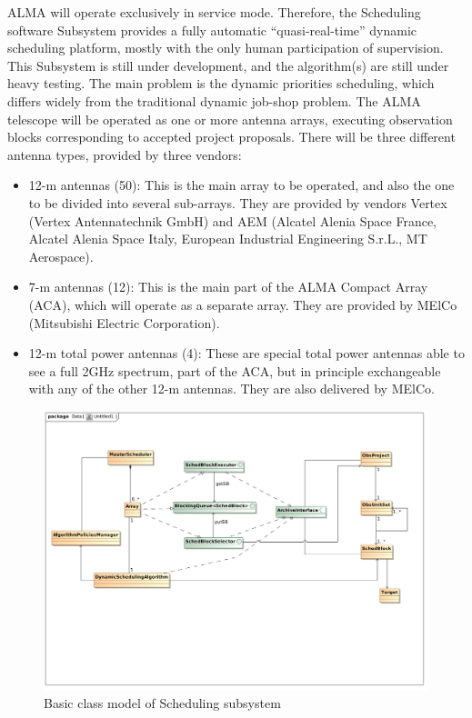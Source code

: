 ALMA will operate exclusively in service mode. Therefore, the Scheduling software Subsystem provides a fully automatic “quasi-real-time” dynamic scheduling platform, mostly with the only human participation of supervision. This Subsystem is still under development, and the algorithm(s) are still under heavy testing. The main problem is the dynamic priorities scheduling, which differs widely from the traditional dynamic job-shop problem.
The ALMA telescope will be operated as one or more antenna arrays, executing observation blocks corresponding to accepted project proposals. There will be three different antenna types, provided by three vendors:
\begin{itemize}
\item 12-m antennas (50): This is the main array to be operated, and also the one to be divided into several sub-arrays. They are provided by vendors Vertex (Vertex Antennatechnik GmbH) and AEM (Alcatel Alenia Space France, Alcatel Alenia Space Italy, European Industrial Engineering S.r.L., MT Aerospace).

\item 7-m antennas (12): This is the main part of the ALMA Compact Array (ACA), which will  operate as a separate array. They are provided by MElCo (Mitsubishi Electric Corporation).

\item 12-m total power antennas (4): These are special total power antennas able to see a full 2GHz spectrum, part of the ACA, but in principle exchangeable with any of the other 12-m antennas. They are also delivered by MElCo.
\end{itemize}

\begin{figure}	
\begin{center}
\includegraphics[width=\textwidth]{images/scheduling_class_model}
\end{center}
\caption{Basic class model of Scheduling subsystem}
\label{fig:sched-class-model}
\end{figure}

